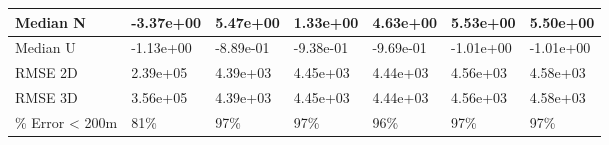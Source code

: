 \begin{longtable}{|l|l|l|l|l|l|l|}
    Median N &  -3.37e+00 &   5.47e+00 &   1.33e+00 &   4.63e+00 &   5.53e+00 &    5.50e+00 \\\hline
    Median U &  -1.13e+00 &  -8.89e-01 &  -9.38e-01 &  -9.69e-01 &  -1.01e+00 &   -1.01e+00 \\\hline
    RMSE 2D  &   2.39e+05 &   4.39e+03 &   4.45e+03 &   4.44e+03 &   4.56e+03 &    4.58e+03 \\\hline
    RMSE 3D  &   3.56e+05 &   4.39e+03 &   4.45e+03 &   4.44e+03 &   4.56e+03 &    4.58e+03 \\\hline
    \% Error < 200m &        81\% &        97\% &        97\% &        96\% &        97\% &         97\% \\\hline
    \end{longtable}
